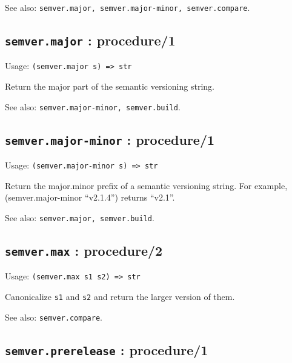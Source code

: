 \documentclass[
]{article}
\newcommand{\passthrough}[1]{#1}
\begin{document}
See also:
\passthrough{\lstinline!semver.major, semver.major-minor, semver.compare!}.

\hypertarget{semver.major-procedure1-1}{%
\subsection{\texorpdfstring{\texttt{semver.major} :
procedure/1}{semver.major : procedure/1}}\label{semver.major-procedure1-1}}

Usage: \passthrough{\lstinline!(semver.major s) => str!}

Return the major part of the semantic versioning string.

See also: \passthrough{\lstinline!semver.major-minor, semver.build!}.

\hypertarget{semver.major-minor-procedure1-1}{%
\subsection{\texorpdfstring{\texttt{semver.major-minor} :
procedure/1}{semver.major-minor : procedure/1}}\label{semver.major-minor-procedure1-1}}

Usage: \passthrough{\lstinline!(semver.major-minor s) => str!}

Return the major.minor prefix of a semantic versioning string. For
example, (semver.major-minor ``v2.1.4'') returns ``v2.1''.

See also: \passthrough{\lstinline!semver.major, semver.build!}.

\hypertarget{semver.max-procedure2-1}{%
\subsection{\texorpdfstring{\texttt{semver.max} :
procedure/2}{semver.max : procedure/2}}\label{semver.max-procedure2-1}}

Usage: \passthrough{\lstinline!(semver.max s1 s2) => str!}

Canonicalize \passthrough{\lstinline!s1!} and
\passthrough{\lstinline!s2!} and return the larger version of them.

See also: \passthrough{\lstinline!semver.compare!}.

\hypertarget{semver.prerelease-procedure1-1}{%
\subsection{\texorpdfstring{\texttt{semver.prerelease} :
procedure/1}{semver.prerelease : procedure/1}}\label{semver.prerelease-procedure1-1}}
\end{document}
